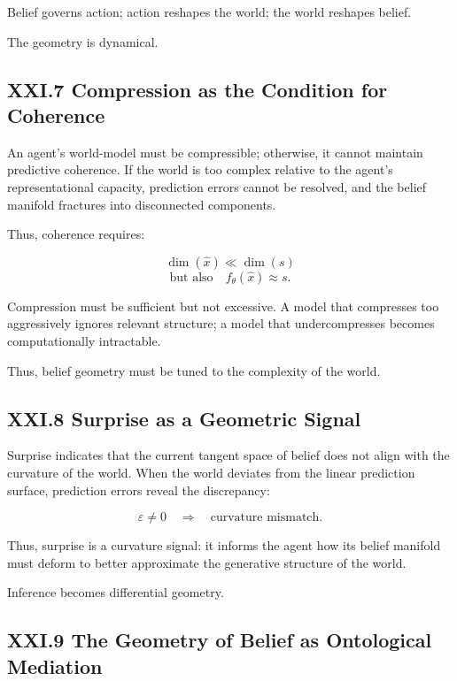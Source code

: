\documentclass[11pt,letterpaper]{article}
\begin{document}
Belief governs action; action reshapes the world; the world reshapes belief.

The geometry is dynamical.

\subsection{XXI.7 Compression as the Condition for Coherence}

An agent’s world-model must be compressible; otherwise, it cannot maintain predictive coherence. If the world is too complex relative to the agent’s representational capacity, prediction errors cannot be resolved, and the belief manifold fractures into disconnected components.

Thus, coherence requires:

\[
\dim(\hat{x}) \ll \dim(s)
\]
\[
\text{but also} \quad f_\theta(\hat{x}) \approx s.
\]

Compression must be sufficient but not excessive.  
A model that compresses too aggressively ignores relevant structure; a model that undercompresses becomes computationally intractable.

Thus, belief geometry must be tuned to the complexity of the world.

\subsection{XXI.8 Surprise as a Geometric Signal}

Surprise indicates that the current tangent space of belief does not align with the curvature of the world. When the world deviates from the linear prediction surface, prediction errors reveal the discrepancy:

\[
\varepsilon \neq 0 \quad \Rightarrow \quad \text{curvature mismatch}.
\]

Thus, surprise is a curvature signal: it informs the agent how its belief manifold must deform to better approximate the generative structure of the world.

Inference becomes differential geometry.

\subsection{XXI.9 The Geometry of Belief as Ontological Mediation}
\end{document}
